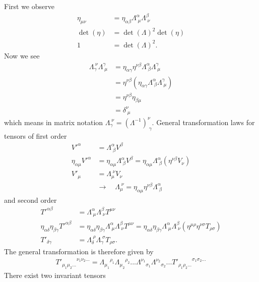 \documentclass[../main.tex]{subfiles}
\begin{document}
First we observe
\begin{align}
    \eta_{\mu\nu} &= \eta_{\alpha\beta}\Lambda^\alpha_{\;\mu} \Lambda^\beta_{\;\nu}\\
    \det(\eta)&=\det(\Lambda)^2\det(\eta)\\
    1&=\det(\Lambda)^2.
\end{align}
Now we see
\begin{align}
    \Lambda_\gamma^{\;\nu}\Lambda^\gamma_{\;\mu}&=\eta_{\alpha\gamma}\eta^{\nu\beta}\Lambda^\alpha_{\;\beta} \Lambda^\gamma_{\;\mu}\\
    &=\eta^{\nu\beta}(\eta_{\alpha\gamma}\Lambda^\alpha_{\;\beta} \Lambda^\gamma_{\;\mu})\\
    &=\eta^{\nu\beta}\eta_{\beta\mu}\\
    &=\delta^\nu_{\;\mu}
\end{align}
which means in matrix notation $\Lambda_\gamma^{\;\nu}=(\Lambda^{-1})^\nu_{\;\gamma}$.
General transformation laws for tensors of first order
\begin{align}
    V'^\alpha&=\Lambda^\alpha_{\;\beta}V^\beta\\
    \eta_{\alpha\mu}V'^\alpha&=\eta_{\alpha\mu}\Lambda^\alpha_{\;\beta}V^\beta=\eta_{\alpha\mu}\Lambda^\alpha_{\;\beta}(\eta^{\nu\beta}V_\nu)\\
    V'_\mu&=\Lambda_\mu^{\;\nu}V_\nu\\
    &\rightarrow\quad \Lambda_\mu^{\;\nu} = \eta_{\alpha\mu}\eta^{\nu\beta}\Lambda^\alpha_{\;\beta}
\end{align}
and second order
\begin{align}
    T'^{\alpha\beta}&=\Lambda^\alpha_{\;\mu}\Lambda^\beta_{\;\nu}T^{\mu\nu}\\
    \eta_{\alpha\delta}\eta_{\beta\gamma}T'^{\alpha\beta}&=\eta_{\alpha\delta}\eta_{\beta\gamma}\Lambda^\alpha_{\;\mu}\Lambda^\beta_{\;\nu}T^{\mu\nu}=\eta_{\alpha\delta}\eta_{\beta\gamma}\Lambda^\alpha_{\;\mu}\Lambda^\beta_{\;\nu}(\eta^{\mu\rho}\eta^{\nu\sigma} T_{\rho\sigma})\\
    T'_{\delta\gamma}&=\Lambda_\delta^{\;\rho}\Lambda_\gamma^{\;\sigma}T_{\rho\sigma}.
\end{align}
The general transformation is therefore given by
\begin{align}
    {T'_{\mu_1\mu_2...}}^{\nu_1\nu_2...}={\Lambda_{\mu_1}}^{\rho_1}{\Lambda_{\mu_2}}^{\rho_2}... {\Lambda^{\nu_1}}_{\sigma_1}{\Lambda^{\nu_2}}_{\sigma_2}... {T'_{\rho_1\rho_2...}}^{\sigma_1\sigma_2...}
\end{align}
There exist two invariant tensors
\end{document}
